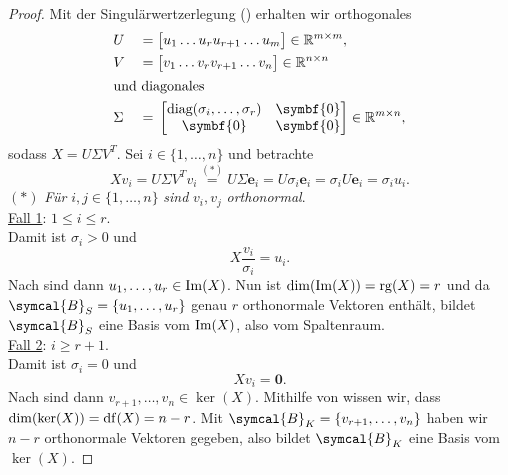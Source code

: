 \begin{proof}
    Mit der Singulärwertzerlegung () erhalten wir orthogonales
    \begin{alignat*}{2}
        &U &{}={}&
        \big[
        \begin{matrix}
            u_1 \dots u_{r}u_{r+1} \dots u_m
        \end{matrix}
        \big]
        \in \R^{m \times m}, \\
        &V &{}={}&
        \big[
        \begin{matrix}
            v_1 \dots v_{r}v_{r+1} \dots v_n
        \end{matrix}
        \big]
        \in \R^{n \times n} \\
        \intertext{und diagonales} 
        &\Sigma &{}={}&
        \begin{bmatrix}
            \text{diag}(\sigma_i,\ldots,\sigma_r) & \symbf{0} \\
            \symbf{0} & \symbf{0}
        \end{bmatrix}
        \in \R^{m \times n},
    \end{alignat*} 
    sodass
    \(
        X = U \Sigma V^{T}
    \).
    Sei \(i \in \{1,\ldots,n\}\) und betrachte 
    \begin{equation*}
        Xv_i = U \Sigma V^{T}v_i \overset{(*)}{=} U \Sigma \symbf{e}_i = U \sigma_i \symbf{e}_i = \sigma_i U \symbf{e}_i = \sigma_i u_i.
    \end{equation*}
    {\small\((*)\) \textit{Für} \(i, j \in \{1,\ldots,n\}\) \textit{sind} \(v_i, v_j\) \textit{orthonormal}.} 
    \vspace{5pt}
    \\
    \underline{Fall 1}: \(1 \leq i \leq r\). \\
    Damit ist \(\sigma_i > 0\) und
    \begin{equation*}
        X \frac{v_i}{\sigma_i} = u_i.
    \end{equation*} 
    Nach  sind dann \(u_1,\ldots,u_r \in \operatorname{Im}(X)\).
    Nun ist \(\dim(\operatorname{Im}(X)) = \operatorname{rg}(X) = r\) und da \(\symcal{B}_S = \{u_1,\ldots,u_r\}\) genau \(r\) orthonormale Vektoren enthält, bildet \(\symcal{B}_S\) eine Basis vom \(\operatorname{Im}(X)\), also vom Spaltenraum. 
    \vspace{5pt} \\
    \underline{Fall 2}: \(i \geq r+1\). \\
    Damit ist \(\sigma_i = 0\) und
    \begin{equation*}
        Xv_i = \symbf{0}.
    \end{equation*}  
    Nach  sind dann \(v_{r+1},\ldots,v_n \in \ker(X)\).
    Mithilfe von  wissen wir, dass \(\dim(\ker(X)) = \operatorname{df}(X) = n - r\). 
    Mit \(\symcal{B}_K = \{v_{r+1},\ldots,v_n\}\) haben wir \(n-r\) orthonormale Vektoren gegeben, also bildet \(\symcal{B}_K\) eine Basis vom \(\ker(X)\).
    

\end{proof}
